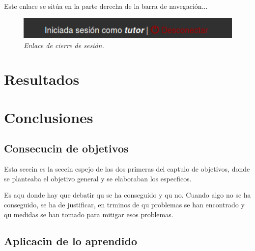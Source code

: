 \documentclass[a4paper, 12pt]{book}
\begin{document}
Este enlace se sit\'ua en la parte derecha de la barra de navegaci\'on...
\begin{figure}
  \centering
  \includegraphics[width=17cm, keepaspectratio]{imagenes/CierreSesion}
  \caption{\textit{Enlace de cierre de sesi\'on.}}
  \label{fig:cierresesion}
\end{figure}



\cleardoublepage
\chapter{Resultados}





\cleardoublepage
\chapter{Conclusiones}
\label{chap:conclusiones}


\section{Consecucin de objetivos}
\label{sec:consecucion-objetivos}

Esta seccin es la seccin espejo de las dos primeras del captulo de objetivos,
donde se planteaba el objetivo general y se elaboraban los especficos.

Es aqu donde hay que debatir qu se ha conseguido y qu no. Cuando algo no
se ha conseguido, se ha de justificar, en trminos de qu problemas se han
encontrado y qu medidas se han tomado para mitigar esos problemas.


\section{Aplicacin de lo aprendido}
\label{sec:aplicacion}
\end{document}
